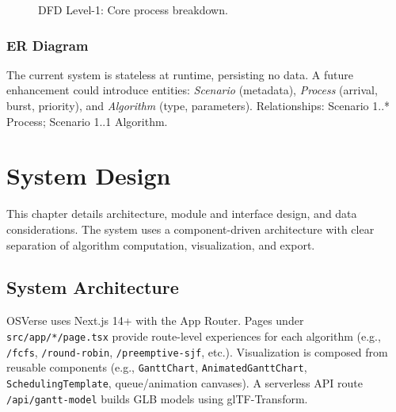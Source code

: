 \documentclass[12pt,a4paper,oneside]{report}
\begin{document}
\begin{figure}[H]
  \centering
  \caption{DFD Level-1: Core process breakdown.}
  \label{fig:dfd1}
\end{figure}

\subsection{ER Diagram}
The current system is stateless at runtime, persisting no data. A future enhancement could introduce entities: \textit{Scenario} (metadata), \textit{Process} (arrival, burst, priority), and \textit{Algorithm} (type, parameters). Relationships: Scenario 1..* Process; Scenario 1..1 Algorithm.

\chapter{System Design}
\noindent This chapter details architecture, module and interface design, and data considerations. The system uses a component-driven architecture with clear separation of algorithm computation, visualization, and export.

\section{System Architecture}
OSVerse uses Next.js 14+ with the App Router. Pages under \verb|src/app/*/page.tsx| provide route-level experiences for each algorithm (e.g., \verb|/fcfs|, \verb|/round-robin|, \verb|/preemptive-sjf|, etc.). Visualization is composed from reusable components (e.g., \verb|GanttChart|, \verb|AnimatedGanttChart|, \verb|SchedulingTemplate|, queue/animation canvases). A serverless API route \verb|/api/gantt-model| builds GLB models using glTF-Transform.
\end{document}
